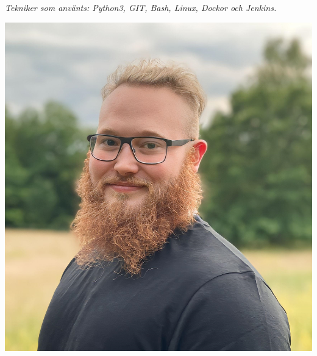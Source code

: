 \documentclass{article}
\begin{document}
\begin{minipage}[t]{0.7\textwidth}
\vspace{5pt}\textit{Tekniker som använts: Python3, GIT, Bash, Linux, Dockor och Jenkins.}

\end{minipage}%
\hfill
\begin{minipage}[t]{0.28\textwidth}
\begin{minipage}[t]{0.8\textwidth}
\vspace{-140pt} %
  \includegraphics[width=\linewidth]{me.png}
  \label{fig:bild}
\end{minipage}
\vspace{-10pt} %

\end{minipage}
\end{document}
